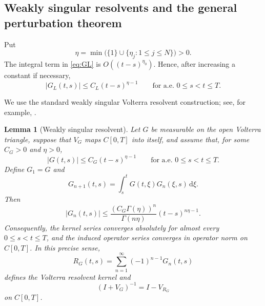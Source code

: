 \documentclass[11pt]{article}
\numberwithin{equation}{section}
\newtheorem{lemma}{Lemma}
\theoremstyle{definition}
\theoremstyle{remark}
\newcommand{\dd}{\,\mathrm d}
\begin{document}
\subsection{Weakly singular resolvents and the general perturbation theorem}

Put
\begin{equation*}
\eta=\min\bigl(\{1\}\cup\{\eta_j:1\le j\le N\}\bigr)>0.
\end{equation*}
The integral term in \eqref{eq:GL} is $O((t-s)^{\eta_0})$. Hence, after increasing a constant if necessary,
\begin{equation*}
|G_L(t,s)|\le C_L(t-s)^{\eta-1}
\qquad\text{for a.e. }0\le s<t\le T.
\end{equation*}

We use the standard weakly singular Volterra resolvent construction; see, for example, \cite{Becker2011,Brunner2017,Gripenberg1990,Pruss1993}.

\begin{lemma}[Weakly singular resolvent]\label{lem:resolvent}
Let $G$ be measurable on the open Volterra triangle, suppose that $V_G$ maps $C[0,T]$ into itself, and assume that, for some $C_G>0$ and $\eta>0$,
\begin{equation*}
|G(t,s)|\le C_G(t-s)^{\eta-1}
\qquad\text{for a.e. }0\le s<t\le T.
\end{equation*}
Define $G_1=G$ and
\begin{equation*}
G_{n+1}(t,s)=\int_s^tG(t,\xi)G_n(\xi,s)\dd\xi.
\end{equation*}
Then
\begin{equation*}
|G_n(t,s)|\le\frac{(C_G\Gamma(\eta))^n}{\Gamma(n\eta)}(t-s)^{n\eta-1}.
\end{equation*}
Consequently, the kernel series converges absolutely for almost every $0\le s<t\le T$, and the induced operator series converges in operator norm on $C[0,T]$. In this precise sense,
\begin{equation}
R_G(t,s)=\sum_{n=1}^{\infty}(-1)^{n-1}G_n(t,s)
\end{equation}
defines the Volterra resolvent kernel and
\begin{equation}
(I+V_G)^{-1}=I-V_{R_G}
\end{equation}
on $C[0,T]$.
\end{lemma}
\end{document}
